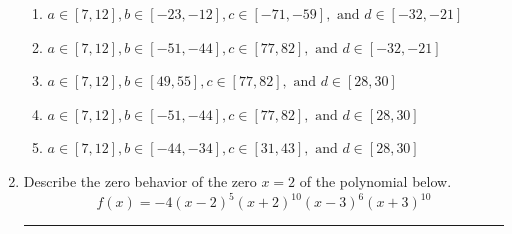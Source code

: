 \documentclass[14pt]{extbook}
\newcommand{\litem}[1]{\item#1\hspace*{-1cm}\rule{\textwidth}{0.4pt}}
\begin{document}
\begin{enumerate}
{\begin{enumerate}[label=\Alph*.]
\item \( a \in [7, 12], b \in [-23, -12], c \in [-71, -59], \text{ and } d \in [-32, -21] \)
\item \( a \in [7, 12], b \in [-51, -44], c \in [77, 82], \text{ and } d \in [-32, -21] \)
\item \( a \in [7, 12], b \in [49, 55], c \in [77, 82], \text{ and } d \in [28, 30] \)
\item \( a \in [7, 12], b \in [-51, -44], c \in [77, 82], \text{ and } d \in [28, 30] \)
\item \( a \in [7, 12], b \in [-44, -34], c \in [31, 43], \text{ and } d \in [28, 30] \)

\end{enumerate} }
\litem{
Describe the zero behavior of the zero $x = 2$ of the polynomial below.\[ f(x) = -4(x - 2)^{5}(x + 2)^{10}(x - 3)^{6}(x + 3)^{10} \]\begin{enumerate}[label=\Alph*.]

\end{enumerate}}
\end{enumerate}
\end{document}
